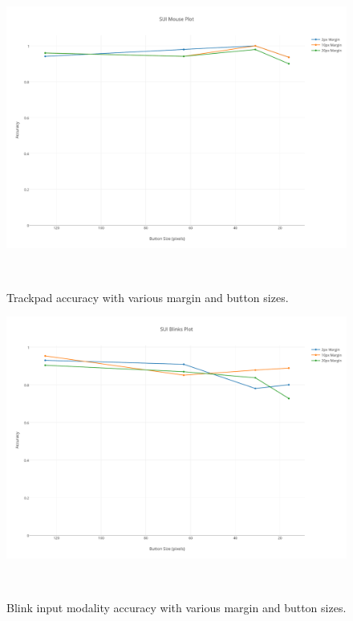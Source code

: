 \documentclass{sigchi}
\begin{document}
\begin{figure}
\centering
  \includegraphics[width=0.9\columnwidth]{figures/mouse-accuracy.pdf}
  \caption{Trackpad accuracy with various margin and button sizes.
  }~\label{fig:mouse-accuracy}
\end{figure}

\begin{figure}
\centering
  \includegraphics[width=0.9\columnwidth]{figures/blink-accuracy.pdf}
  \caption{Blink input modality accuracy with various margin and button sizes.
  }~\label{fig:blink-accuracy}
\end{figure}
\end{document}
